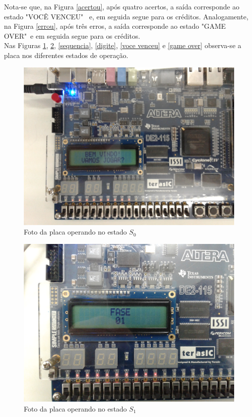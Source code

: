 \documentclass[14pt, oneside]{book}
\newcommand\tab[1][1cm]{\hspace*{#1}}
\theoremstyle{definition}
\begin{document}
           \tab Nota-se que, na Figura \ref{acertou}, após quatro acertos, a saída corresponde ao estado "VOCÊ VENCEU" \ e, em seguida segue para os créditos. Analogamente, na Figura \ref{errou}, após três erros, a saída corresponde ao estado "GAME OVER"\ e em seguida segue para os créditos. \\
           \tab Nas Figuras \ref{bem vindo}, \ref{fase}, \ref{sequencia}, \ref{digite}, \ref{voce venceu} e \ref{game over} observa-se a placa nos diferentes estados de operação.
           
           
                
            
            
                \begin{figure}[H]
                    \centering
                    \includegraphics[scale=0.14]{foto_placa_bemvindo.jpg}
                    \caption{Foto da placa operando no estado $S_0$}
                    \label{bem vindo}
                \end{figure}
                
                \begin{figure}[H]
                    \centering
                    \includegraphics[scale=0.14]{foto_placa_fase.jpg}
                    \caption{Foto da placa operando no estado $S_1$}
                    \label{fase}
                \end{figure}
                
\end{document}
